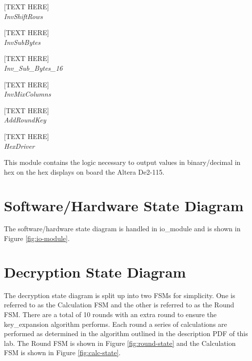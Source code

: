 \documentclass[journal, twocolumn, final,11pt,letterpaper]{IEEEtran}
\begin{document}
[TEXT HERE]\\

\textit{InvShiftRows}\\
\vspace{-4mm}

[TEXT HERE]\\

\textit{InvSubBytes}\\
\vspace{-4mm}

[TEXT HERE]\\

\textit{Inv\_Sub\_Bytes\_16}\\
\vspace{-4mm}

[TEXT HERE]\\

\textit{InvMixColumns}\\
\vspace{-4mm}

[TEXT HERE]\\

\textit{AddRoundKey}\\
\vspace{-4mm}

[TEXT HERE]\\

\textit{HexDriver}\\
\vspace{-4mm}

This module contains the logic necessary to output values in binary/decimal in hex on the hex displays on board the Altera De2-115.\\


\section{Software/Hardware State Diagram}
The software/hardware state diagram is handled in io\_module and is shown in Figure \ref{fig:io-module}.

\section{Decryption State Diagram}
The decryption state diagram is split up into two FSMs for simplicity. One is referred to as the Calculation FSM and the other is referred to as the Round FSM. There are a total of 10 rounds with an extra round to ensure the key\_expansion algorithm performs. Each round a series of calculations are performed as determined in the algorithm outlined in the description PDF of this lab. The Round FSM is shown in Figure \ref{fig:round-state} and the Calculation FSM is shown in Figure \ref{fig:calc-state}.
\end{document}
